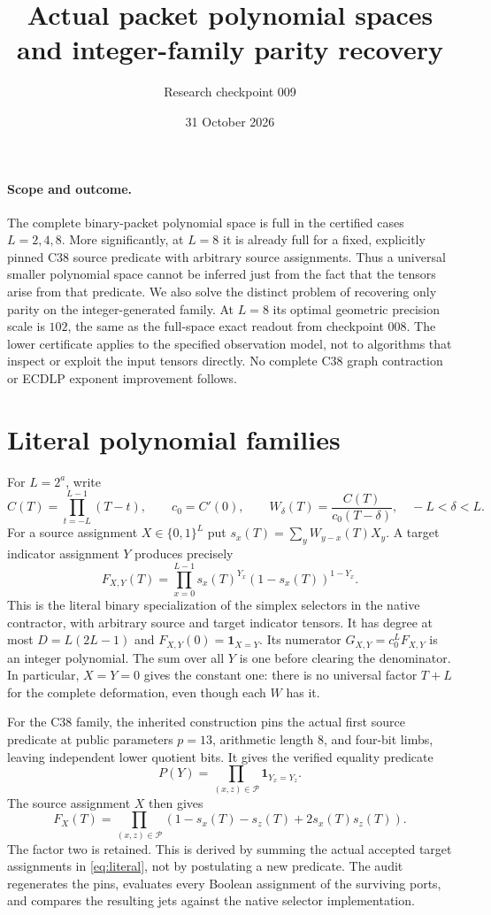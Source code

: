 \documentclass[11pt]{article}
\title{Actual packet polynomial spaces and integer-family parity recovery}
\author{Research checkpoint 009}
\date{31 October 2026}
\begin{document}
\maketitle

\paragraph{Scope and outcome.}
The complete binary-packet polynomial space is full in the certified
cases $L=2,4,8$. More significantly, at $L=8$ it is already full for a
fixed, explicitly pinned C38 source predicate with arbitrary source
assignments. Thus a universal smaller polynomial space cannot be
inferred just from the fact that the tensors arise from that predicate.
We also solve the distinct problem of recovering only parity on the
integer-generated family. At $L=8$ its optimal geometric precision
scale is $102$, the same as the full-space exact readout from checkpoint
008. The lower certificate applies to the specified observation model,
not to algorithms that inspect or exploit the input tensors directly.
No complete C38 graph contraction or ECDLP exponent improvement follows.

\section{Literal polynomial families}
For $L=2^a$, write
\[
 C(T)=\prod_{t=-L}^{L-1}(T-t),\qquad c_0=C'(0),\qquad
 W_\delta(T)=\frac{C(T)}{c_0(T-\delta)},\quad -L<\delta<L.
\]
For a source assignment $X\in\{0,1\}^L$ put
$s_x(T)=\sum_y W_{y-x}(T)X_y$. A target indicator assignment $Y$
produces precisely
\begin{equation}
 F_{X,Y}(T)=\prod_{x=0}^{L-1}s_x(T)^{Y_x}
                                      (1-s_x(T))^{1-Y_x}.
 \label{eq:literal}
\end{equation}
This is the literal binary specialization of the simplex selectors in
the native contractor, with arbitrary source and target indicator
tensors. It has degree at most $D=L(2L-1)$ and
$F_{X,Y}(0)=\mathbf1_{X=Y}$.
Its numerator $G_{X,Y}=c_0^L F_{X,Y}$ is an integer polynomial.
The sum over all $Y$ is one before clearing the denominator.
In particular, $X=Y=0$ gives the constant one: there is no universal
factor $T+L$ for the complete deformation, even though each $W$ has it.

For the C38 family, the inherited construction pins the actual first
source predicate at public parameters $p=13$, arithmetic length $8$,
and four-bit limbs, leaving independent lower quotient bits. It gives
the verified equality predicate
\[
 P(Y)=\prod_{(x,z)\in\mathcal P}\mathbf1_{Y_x=Y_z}.
\]
The source assignment $X$ then gives
\begin{equation}
 F_X(T)=\prod_{(x,z)\in\mathcal P}
        (1-s_x(T)-s_z(T)+2s_x(T)s_z(T)).
 \label{eq:copy}
\end{equation}
The factor two is retained. This is derived by summing the actual
accepted target assignments in \eqref{eq:literal}, not by postulating a
new predicate. The audit regenerates the pins, evaluates every Boolean
assignment of the surviving ports, and compares the resulting jets
against the native selector implementation.
\end{document}
